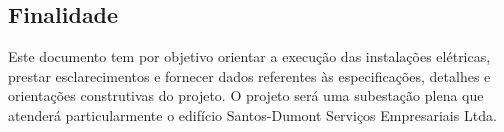 \subsection{Finalidade}

Este documento tem por objetivo orientar a execução das instalações elétricas, prestar esclarecimentos e fornecer dados referentes às especificações, detalhes e orientações construtivas do projeto. O projeto será uma subestação plena que atenderá particularmente o edifício Santos-Dumont Serviços Empresariais Ltda.
